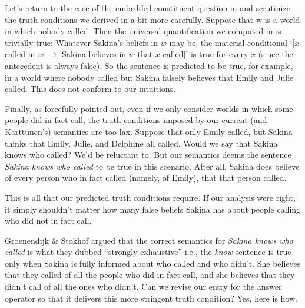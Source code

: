 %
Let's return to the case of the embedded constituent question in
 and scrutinize the truth conditions we derived in
 a bit more carefully. Suppose that w is a world in
which nobody called. Then the universal quantification we computed in
 is trivially true: Whatever Sakina's beliefs in $w$
may be, the material conditional `[$x$ called in $w$ $\rightarrow$ Sakina
believes in $w$ that $x$ called]' is true for every $x$ (since the antecedent is
always false). So the sentence  is predicted to be true, for
example, in a world where nobody called but Sakina falsely believes that Emily
and Julie called. This does not conform to our intuitions.

Finally, as \cite{groenendijk-stokhof-1982-wh-complements} forcefully pointed
out, even if we only consider worlds in which some people did in fact call, the
truth conditions imposed by our current (and Karttunen's) semantics are too lax.
Suppose that only Emily called, but Sakina thinks that Emily, Julie, and
Delphine all called. Would we say that Sakina knows who called? We'd be
reluctant to. But our semantics deems the sentence \emph{Sakina knows who
  called} to be true in this scenario. After all, Sakina does believe of every
person who in fact called (namely, of Emily), that that person called.

This is all that our predicted truth conditions require. If our analysis were
right, it simply shouldn't matter how many false beliefs Sakina has about people
calling who did not in fact call.

Groenendijk \& Stokhof argued that the correct semantics for \emph{Sakina knows
  who called} is what they dubbed ``strongly exhaustive'' \dash i.e., the
\emph{know}-sentence is true only when Sakina is fully informed about who called
and who didn't. She believes that they called of all the people who did in fact
call, and she believes that they didn't call of all the ones who didn't. Can we
revise our entry for the answer operator so that it delivers this more stringent
truth condition? Yes, here is how.

